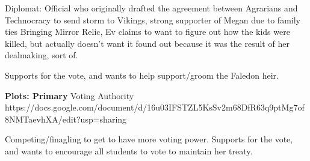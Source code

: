 \documentclass[char]{GL2020}
\begin{document}
\name{\cDiplomat{}}







Diplomat: Official who originally drafted the agreement between Agrarians and Technocracy to send storm to Vikings, 	strong supporter of Megan due to family ties	Bringing Mirror Relic, Ev claims to want to figure out how the kids were killed, but actually doesn't want it found out because it was the result of her dealmaking, sort of.

Supports \cHeir{} for the vote, and wants to help support/groom the Faledon heir.

\textbf{Plots: Primary}
Voting Authority
https://docs.google.com/document/d/16u03IFSTZL5KsSv2m68DfR63q9ptMg7of8NMTaevhXA/edit?usp=sharing

Competing/finagling to get to have more voting power.  Supports \cHeir{} for the vote, and wants to encourage all students to vote to maintain her treaty.
\end{document}
